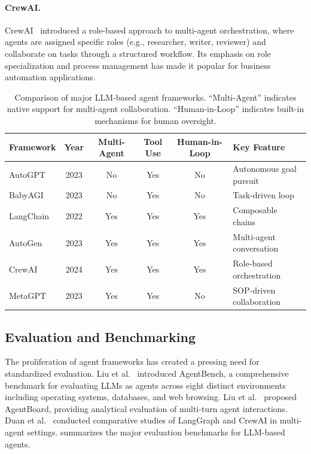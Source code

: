 \documentclass[11pt,a4paper]{article}
\begin{document}
\paragraph{CrewAI.} CrewAI~\citep{crewai2024} introduced a role-based approach to multi-agent orchestration, where agents are assigned specific roles (e.g., researcher, writer, reviewer) and collaborate on tasks through a structured workflow. Its emphasis on role specialization and process management has made it popular for business automation applications.

\begin{table}[tbp]
\centering
\caption{Comparison of major LLM-based agent frameworks. ``Multi-Agent'' indicates native support for multi-agent collaboration. ``Human-in-Loop'' indicates built-in mechanisms for human oversight.}
\label{tab:frameworks}
\begin{tabular}{@{}lccccl@{}}
\toprule
\textbf{Framework} & \textbf{Year} & \textbf{Multi-Agent} & \textbf{Tool Use} & \textbf{Human-in-Loop} & \textbf{Key Feature} \\
\midrule
AutoGPT       & 2023 & No  & Yes & No  & Autonomous goal pursuit \\
BabyAGI        & 2023 & No  & Yes & No  & Task-driven loop \\
LangChain      & 2022 & Yes & Yes & Yes & Composable chains \\
AutoGen        & 2023 & Yes & Yes & Yes & Multi-agent conversation \\
CrewAI         & 2024 & Yes & Yes & Yes & Role-based orchestration \\
MetaGPT        & 2023 & Yes & Yes & No  & SOP-driven collaboration \\
\bottomrule
\end{tabular}
\end{table}

\subsection{Evaluation and Benchmarking}

The proliferation of agent frameworks has created a pressing need for standardized evaluation. Liu et al.~\citep{liu2023agentbench} introduced AgentBench, a comprehensive benchmark for evaluating LLMs as agents across eight distinct environments including operating systems, databases, and web browsing. Liu et al.~\citep{liu2024agentboard} proposed AgentBoard, providing analytical evaluation of multi-turn agent interactions. Duan et al.~\citep{duan2024exploration} conducted comparative studies of LangGraph and CrewAI in multi-agent settings.  summarizes the major evaluation benchmarks for LLM-based agents.
\end{document}
